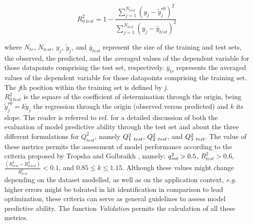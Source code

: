 \documentclass[twoside,a4wide,10pt]{article}
\begin{document}
\begin{equation}
R_{0\:test}^2 = 1 - \frac {\sum_{j=1}^{N_{test}} (y_{j} - \widetilde{y}_{j}^{ r0})^{2}} {\sum_{j=1}^{N_{test}} (y_{j} - \bar{y}_{test})^{2}} 
\end{equation}

where $N_{tr}$, $N_{test}$, $y_j$, $\widetilde{y}_j$, and $\bar{y}_{test}$ represent the size of the training and test sets, the observed, the predicted, and the averaged values of the dependent variable for those datapoints comprising the test set, respectively.
$\bar{y}_{tr}$ represents the averaged values of the dependent variable for those datapoints comprising the training set.
The {\it j}th position within the training set is defined by {\it j}.\\  

$R_{0\:test}^2$ is the square of the coefficient of determination through the origin, being $\widetilde{y}_{j}^{ r0} = k \widetilde{y}_j$ the regression through the origin (observed versus predicted) and $k$ its slope.
The reader is referred to ref. \citep{consonni} for a detailed discussion of both the evaluation of model predictive ability through the test set and about the three different formulations for $Q^{2}_{test}$, namely $Q_{1\ {\it test}}^{2}$, $Q_{2\ {\it test}}^{2}$, and $Q_{3\ {\it test}}^{2}$. 
The value of these metrics permits the assessment of model performance according to the criteria proposed by Tropsha and Golbraikh \citep{beware,earnest},
namely:
$q_{{\it int}}^{2} > 0.5$,
$R_{test}^2 > 0.6$,
$ \frac {(R_{test}^2 - R_{0\:test}^2)} {R_{test}^2} < 0.1$, and
$0.85 \leq k \leq 1.15$.
Although these values
might change depending on the dataset modelled, as
well as on the application context, {\it e.g.} higher errors might be tolrated 
in hit identification in comparison to lead optimization,
these criteria can serve as general guidelines to assess model predictive ability.
The function {\it Validation} permits the calculation of all these metrics.
\end{document}
